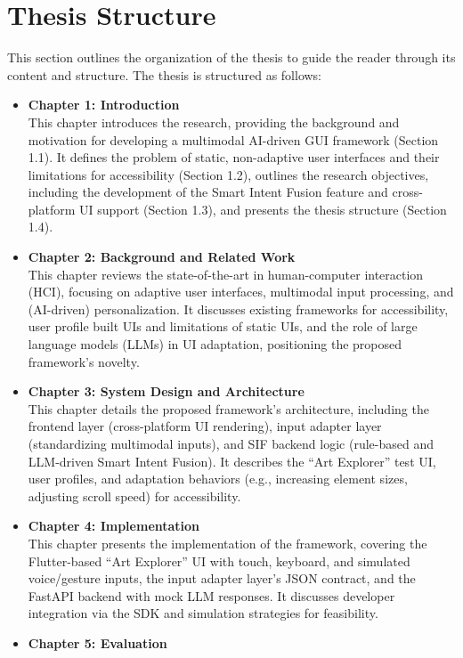 \documentclass[openany]{book}
\begin{document}
\section{Thesis Structure}
This section outlines the organization of the thesis to guide the reader through its content and structure.
The thesis is structured as follows:
\begin{itemize}
    \item \textbf{Chapter 1: Introduction} \\
    This chapter introduces the research, providing the background and motivation for developing a multimodal AI-driven GUI framework (Section 1.1). It defines the problem of static, non-adaptive user interfaces and their limitations for accessibility (Section 1.2), outlines the research objectives, including the development of the Smart Intent Fusion feature and cross-platform UI support (Section 1.3), and presents the thesis structure (Section 1.4).
    \item \textbf{Chapter 2: Background and Related Work} \\
    This chapter reviews the state-of-the-art in human-computer interaction (HCI), focusing on adaptive user interfaces, multimodal input processing, and (AI-driven) personalization. It discusses existing frameworks for accessibility, user profile built UIs and limitations of static UIs, and the role of large language models (LLMs) in UI adaptation, positioning the proposed framework’s novelty.
    \item \textbf{Chapter 3: System Design and Architecture} \\
    This chapter details the proposed framework’s architecture, including the frontend layer (cross-platform UI rendering), input adapter layer (standardizing multimodal inputs), and SIF backend logic (rule-based and LLM-driven Smart Intent Fusion). It describes the “Art Explorer” test UI, user profiles, and adaptation behaviors (e.g., increasing element sizes, adjusting scroll speed) for accessibility.
    \item \textbf{Chapter 4: Implementation} \\
    This chapter presents the implementation of the framework, covering the Flutter-based “Art Explorer” UI with touch, keyboard, and simulated voice/gesture inputs, the input adapter layer’s JSON contract, and the FastAPI backend with mock LLM responses. It discusses developer integration via the SDK and simulation strategies for feasibility.
    \item \textbf{Chapter 5: Evaluation} \\

\end{itemize}
\end{document}
